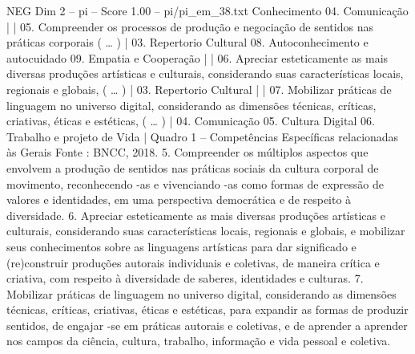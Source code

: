 \begin{textsample}{NEG Dim 2 – pi – Score 1.00 – pi/pi\_em\_38.txt}
Conhecimento 04.
Comunicação | | 05.
Compreender os processos de produção e negociação de sentidos nas práticas corporais ( … ) | 03.
Repertorio Cultural 08.
Autoconhecimento e autocuidado 09.
Empatia e Cooperação | | 06.
Apreciar esteticamente as mais diversas produções artísticas e culturais, considerando suas características locais, regionais e globais, ( … ) | 03.
Repertorio Cultural | | 07.
Mobilizar práticas de linguagem no universo digital, considerando as dimensões técnicas, críticas, criativas, éticas e estéticas, ( … ) | 04.
Comunicação 05.
Cultura Digital 06.
Trabalho e projeto de Vida | Quadro 1 – Competências Específicas relacionadas às Gerais Fonte : BNCC, 2018. 5.
Compreender os múltiplos aspectos que envolvem a produção de sentidos nas práticas sociais da cultura corporal de movimento, reconhecendo -as e vivenciando -as como formas de expressão de valores e identidades, em uma perspectiva democrática e de respeito à diversidade. 6.
Apreciar esteticamente as mais diversas produções artísticas e culturais, considerando suas características locais, regionais e globais, e mobilizar seus conhecimentos sobre as linguagens artísticas para dar significado e (re)construir produções autorais individuais e coletivas, de maneira crítica e criativa, com respeito à diversidade de saberes, identidades e culturas. 7.
Mobilizar práticas de linguagem no universo digital, considerando as dimensões técnicas, críticas, criativas, éticas e estéticas, para expandir as formas de produzir sentidos, de engajar -se em práticas autorais e coletivas, e de aprender a aprender nos campos da ciência, cultura, trabalho, informação e vida pessoal e coletiva.

\end{textsample}
